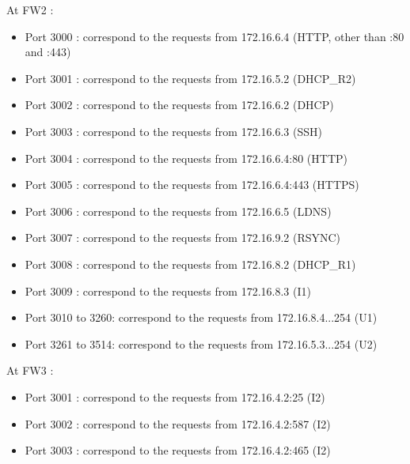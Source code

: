 \documentclass[a4paper,titlepage]{article}
\begin{document}
At FW2 :
\begin{itemize}
	\item Port 3000 : correspond to the requests from 172.16.6.4 (HTTP, other than :80 and :443)
	\item Port 3001 : correspond to the requests from 172.16.5.2 (DHCP\_R2)
	\item Port 3002 : correspond to the requests from 172.16.6.2 (DHCP)
	\item Port 3003 : correspond to the requests from 172.16.6.3 (SSH)
	\item Port 3004 : correspond to the requests from 172.16.6.4:80 (HTTP)
	\item Port 3005 : correspond to the requests from 172.16.6.4:443 (HTTPS)
	\item Port 3006 : correspond to the requests from 172.16.6.5 (LDNS)
	\item Port 3007 : correspond to the requests from 172.16.9.2 (RSYNC)
	\item Port 3008 : correspond to the requests from 172.16.8.2 (DHCP\_R1)
	\item Port 3009 : correspond to the requests from 172.16.8.3 (I1)
	\item Port 3010 to 3260: correspond to the requests from 172.16.8.4...254 (U1)
	\item Port 3261 to 3514: correspond to the requests from 172.16.5.3...254 (U2)

\end{itemize}



At FW3 :
\begin{itemize}
	\item Port 3001 : correspond to the requests from 172.16.4.2:25 (I2)
	\item Port 3002 : correspond to the requests from 172.16.4.2:587 (I2)
	\item Port 3003 : correspond to the requests from 172.16.4.2:465 (I2)
\end{itemize}
\end{document}
